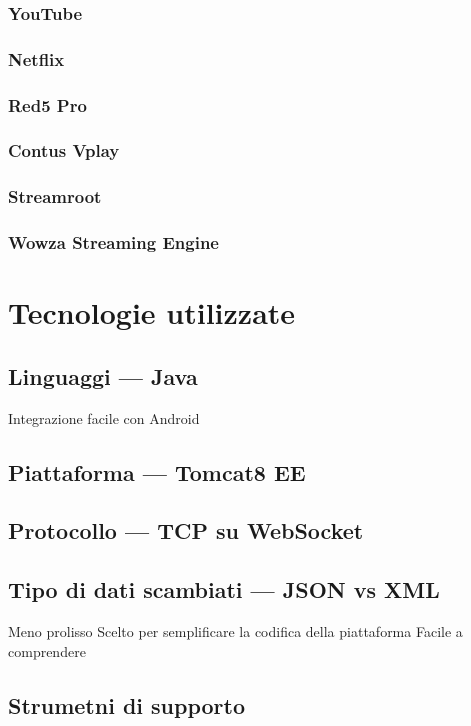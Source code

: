 		\subsubsection{YouTube}
		\subsubsection{Netflix}
		\subsubsection{Red5 Pro}
		\subsubsection{Contus Vplay}
		\subsubsection{Streamroot}
		\subsubsection{Wowza Streaming Engine}

\section{Tecnologie utilizzate}
	\subsection{Linguaggi --- Java}
	 Integrazione facile con Android

	\subsection{Piattaforma --- Tomcat8 EE}

	\subsection{Protocollo --- TCP su WebSocket}

	\subsection{Tipo di dati scambiati --- JSON vs XML}
	 Meno prolisso
	 Scelto per semplificare la codifica della piattaforma
	 Facile a comprendere
	\subsection{Strumetni di supporto}
